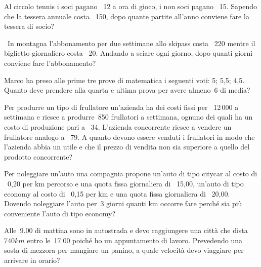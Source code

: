 \begin{multicols}{2}
 \begin{esercizio}
 \label{ese:21.22}
 Al circolo tennis i soci pagano \officialeuro\ 12 a ora di gioco, i non
soci pagano \officialeuro\ 15. Sapendo che la tessera annuale costa
\officialeuro\ 150, dopo quante partite all'anno conviene
fare la tessera di socio?
 \end{esercizio}

 \begin{esercizio}[\Ast]
 \label{ese:21.23}
 \ In montagna l'abbonamento per due settimane allo
skipass costa \officialeuro\ 220 mentre il biglietto giornaliero costa
\officialeuro\ 20. Andando a sciare ogni giorno, dopo quanti giorni
conviene fare l'abbonamento?
 \end{esercizio}

 \begin{esercizio}[\Ast]
 \label{ese:21.24}
 Marco ha preso alle prime tre prove di matematica i seguenti voti: 5;
5,5; 4,5. Quanto deve prendere alla quarta e ultima prova per avere almeno~6
di media?
 \end{esercizio}

 \begin{esercizio}
 \label{ese:21.25}
 Per produrre un tipo di frullatore un'azienda ha dei
costi fissi per \officialeuro\ 12\,000 a settimana e riesce a produrre~850
frullatori a settimana, ognuno dei quali ha un costo di produzione pari
a \officialeuro\ 34. L'azienda concorrente riesce a
vendere un frullatore analogo a \officialeuro\ 79. A quanto devono essere
venduti i frullatori in modo che l'azienda abbia un
utile e che il prezzo di vendita non sia superiore a quello del
prodotto concorrente?
 \end{esercizio}

 \begin{esercizio}[\Ast]
 \label{ese:21.26}
 Per noleggiare un'auto una compagnia propone
un'auto di tipo citycar al costo di \officialeuro\ 0,20 per km percorso e una quota fissa giornaliera
di \officialeuro\ 15,00,
un'auto di tipo economy al costo di \officialeuro\ 0,15
per km e una quota fissa giornaliera di \officialeuro\ 20,00. Dovendo
noleggiare l'auto per~3 giorni quanti km occorre fare
perché sia più conveniente l'auto di tipo economy?
 \end{esercizio}

 \begin{esercizio}
 \label{ese:21.27}
 Alle~9.00 di mattina sono in autostrada e devo raggiungere una città
che dista~$740\unit{km}$ entro le~17.00 poiché ho un appuntamento di lavoro.
Prevedendo una sosta di mezzora per mangiare un panino, a quale
velocità devo viaggiare per arrivare in orario?
 \end{esercizio}


\end{multicols}
